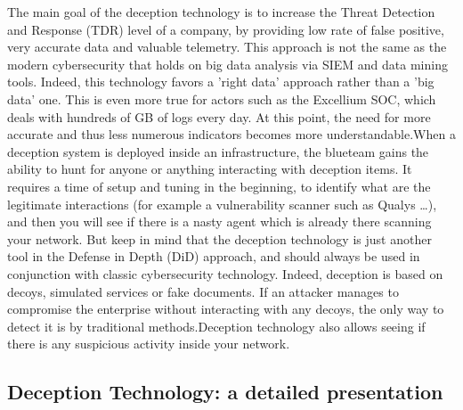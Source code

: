 \documentclass{tnreport}
\begin{document}
The main goal of the deception technology is to increase the Threat Detection and Response (\gls{TDR}) level of a company, by providing low rate of false positive, very accurate data and valuable telemetry. This approach is not the same as the modern cybersecurity that holds on big data analysis via \gls{SIEM} and data mining tools. Indeed, this technology favors a 'right data' approach rather than a 'big data' one. This is even more true for actors such as the \gls{Excellium} \gls{SOC}, which deals with hundreds of GB of logs every day. At this point, the need for more accurate and thus less numerous indicators becomes more understandable.\eol When a deception system is deployed inside an infrastructure, the blueteam gains the ability to hunt for anyone or anything interacting with deception items. It requires a time of setup and tuning in the beginning, to identify what are the legitimate interactions (for example a vulnerability scanner such as Qualys \ldots), and then you will see if there is a nasty agent which is already there scanning your network. But keep in mind that the deception technology is just another tool in the Defense in Depth (\gls{DiD}) approach, and should always be used in conjunction with classic cybersecurity technology. Indeed, deception is based on decoys, simulated services or fake documents. If an attacker manages to compromise the enterprise without interacting with any decoys, the only way to detect it is by traditional methods.\eol Deception technology also allows seeing if there is any suspicious activity inside your network.  

\subsection{Deception Technology: a detailed presentation}
\end{document}
